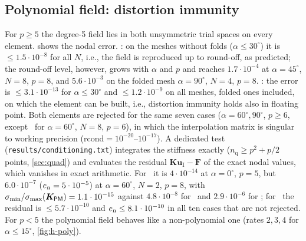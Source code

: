 \subsection{Polynomial field: distortion immunity}\label{sec:poly}
For $p\ge5$ the degree-5 field lies in both unsymmetric trial spaces on every element.
 shows the nodal error. \PM: on the meshes without folds
($\alpha\le30^\circ$) it is $\le1.5\cdot10^{-8}$ for all $N$, i.e., the field is reproduced up
to round-off, as predicted; the round-off level, however, grows with $\alpha$ and $p$ and
reaches $1.7\cdot10^{-4}$ at $\alpha=45^\circ$, $N=8$, $p=8$, and $5.6\cdot10^{-3}$ on the folded mesh
$\alpha=90^\circ$, $N=4$, $p=8$. \PH: the error is $\le3.1\cdot10^{-13}$ for $\alpha\le30^\circ$ and
$\le1.2\cdot10^{-9}$ on all meshes, folded ones included, on which the element can be built,
i.e., distortion immunity holds also in floating point. Both elements are rejected for the
same seven cases ($\alpha=60^\circ,90^\circ$, $p\ge6$, except \PH\ for $\alpha=60^\circ$, $N=8$, $p=6$),
in which the interpolation matrix is singular to working precision
($\mathrm{rcond}=10^{-20}$--$10^{-17}$). A dedicated test (\texttt{results/conditioning.txt})
integrates the stiffness exactly ($n_{\mathrm q}\ge p^2+p/2$ points, \cref{sec:quad}) and evaluates the
residual $\bm K\bm u_{\mathrm I}-\bm F$ of the exact nodal values, which vanishes in exact arithmetic. For
\PM\ it is $4\cdot10^{-14}$ at $\alpha=0^\circ$, $p=5$, but $6.0\cdot10^{-7}$ ($e_{\mathrm{n}}=5\cdot10^{-5}$) at
$\alpha=60^\circ$, $N=2$, $p=8$, with $\sigma_{\min}/\sigma_{\max}(\bm K_{\textsf{PM}})=1.1\cdot10^{-15}$
against $4.8\cdot10^{-8}$ for \PH\ and $2.9\cdot10^{-6}$ for \PP; for \PH\ the residual is
$\le5.7\cdot10^{-10}$ and $e_{\mathrm{n}}\le8.1\cdot10^{-10}$ in all ten cases that are not rejected. For $p<5$ the polynomial
field behaves like a non-polynomial one (rates $2,3,4$ for $\alpha\le15^\circ$, \cref{fig:h-poly}).

\begin{table}[t]
  \centering\small
  \caption{Polynomial field (degree 5): relative nodal error $\en$ for $p\ge5$
    (exact in exact arithmetic for \PM\ and \PH).}
  \label{tab:poly}
  
\end{table}

